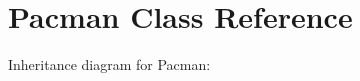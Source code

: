 \hypertarget{class_pacman}{}\section{Pacman Class Reference}
\label{class_pacman}


Inheritance diagram for Pacman\+:

